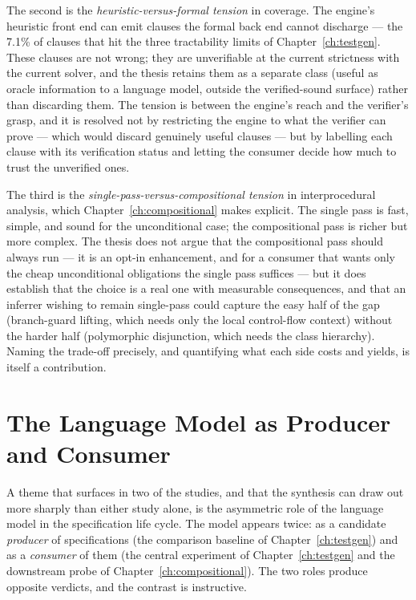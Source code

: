 The second is the \emph{heuristic-versus-formal tension} in coverage. The
engine's heuristic front end can emit clauses the formal back end cannot
discharge --- the 7.1\% of clauses that hit the three tractability limits of
Chapter~\ref{ch:testgen}. These clauses are not wrong; they are unverifiable at
the current strictness with the current solver, and the thesis retains them as a
separate class (useful as oracle information to a language model, outside the
verified-sound surface) rather than discarding them. The tension is between the
engine's reach and the verifier's grasp, and it is resolved not by restricting
the engine to what the verifier can prove --- which would discard genuinely
useful clauses --- but by labelling each clause with its verification status and
letting the consumer decide how much to trust the unverified ones.

The third is the \emph{single-pass-versus-compositional tension} in
interprocedural analysis, which Chapter~\ref{ch:compositional} makes explicit.
The single pass is fast, simple, and sound for the unconditional case; the
compositional pass is richer but more complex. The thesis does not argue that the
compositional pass should always run --- it is an opt-in enhancement, and for a
consumer that wants only the cheap unconditional obligations the single pass
suffices --- but it does establish that the choice is a real one with measurable
consequences, and that an inferrer wishing to remain single-pass could capture
the easy half of the gap (branch-guard lifting, which needs only the local
control-flow context) without the harder half (polymorphic disjunction, which
needs the class hierarchy). Naming the trade-off precisely, and quantifying what
each side costs and yields, is itself a contribution.

\section{The Language Model as Producer and Consumer}
\label{sec:syn-llm}

A theme that surfaces in two of the studies, and that the synthesis can draw out
more sharply than either study alone, is the asymmetric role of the language
model in the specification life cycle. The model appears twice: as a candidate
\emph{producer} of specifications (the comparison baseline of
Chapter~\ref{ch:testgen}) and as a \emph{consumer} of them (the central
experiment of Chapter~\ref{ch:testgen} and the downstream probe of
Chapter~\ref{ch:compositional}). The two roles produce opposite verdicts, and
the contrast is instructive.

